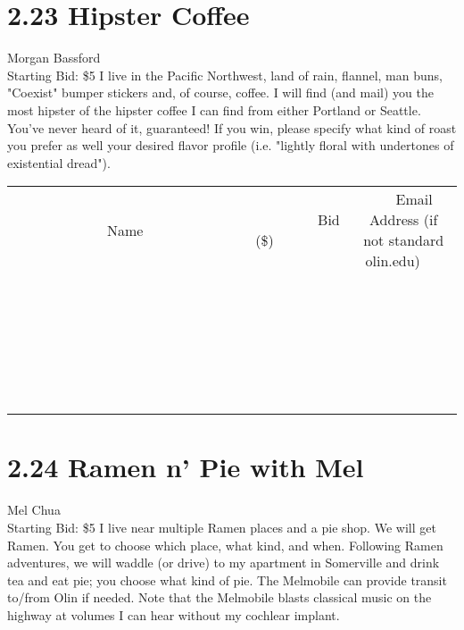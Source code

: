 \documentclass[11pt]{article}
\begin{document}
\section*{2.23 Hipster Coffee}
Morgan Bassford
\\
Starting Bid: \$5
\newline
I live in the Pacific Northwest, land of rain, flannel, man buns, "Coexist" bumper stickers and, of course, coffee. I will find (and mail) you the most hipster of the hipster coffee I can find from either Portland or Seattle. You've never heard of it, guaranteed! If you win, please specify what kind of roast you prefer as well your desired flavor profile (i.e. "lightly floral with undertones of existential dread").
\\[6ex]
\begin{tabular}{c c c}
~~~~~~~~~~~~~Name~~~~~~~~~~~~~ & ~~~~~~~~~Bid (\$)~~~~~~~~~  & ~~~Email Address (if not standard olin.edu)~~~\\
 & & \\
\hline
 & & \\
\hline
 & & \\
\hline
 & & \\
\hline
 & & \\
\hline
 & & \\
\hline
 & & \\
\hline
 & & \\
\hline
 & & \\
\hline
 & & \\
\hline
 & & \\
\hline
 & & \\
\hline
 & & \\
\hline
 & & \\
\hline
 & & \\
\hline
 & & \\
\hline
 & & \\
\hline
 & & \\
\hline
 & & \\
\hline
 & & \\
\hline
 & & \\
\hline
 & & \\
\hline
 & & \\
\hline
 & & \\
\hline
 & & \\
\hline
 & & \\
\hline
\end{tabular}
\newpage
\section*{2.24 Ramen n' Pie with Mel}
Mel Chua
\\
Starting Bid: \$5
\newline
I live near multiple Ramen places and a pie shop. We will get Ramen. You get to choose which place, what kind, and when. Following Ramen adventures, we will waddle (or drive) to my apartment in Somerville and drink tea and eat pie; you choose what kind of pie. The Melmobile can provide transit to/from Olin if needed. Note that the Melmobile blasts classical music on the highway at volumes I can hear without my cochlear implant.
\end{document}
